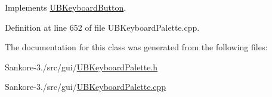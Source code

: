 Implements \hyperlink{class_u_b_keyboard_button_ac4a441fad9d6cb8d63a54318e6738eac}{U\-B\-Keyboard\-Button}.



Definition at line 652 of file U\-B\-Keyboard\-Palette.\-cpp.



The documentation for this class was generated from the following files\-:\begin{DoxyCompactItemize}
\item 
Sankore-\/3./src/gui/\hyperlink{_u_b_keyboard_palette_8h}{U\-B\-Keyboard\-Palette.\-h}\item 
Sankore-\/3./src/gui/\hyperlink{_u_b_keyboard_palette_8cpp}{U\-B\-Keyboard\-Palette.\-cpp}\end{DoxyCompactItemize}
